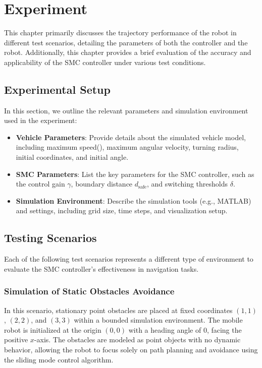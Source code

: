 \chapter{Experiment}

This chapter primarily discusses the trajectory performance of the robot in different test scenarios, detailing the parameters of both the controller and the robot. Additionally, this chapter provides a brief evaluation of the accuracy and applicability of the SMC controller under various test conditions.

\section{Experimental Setup}

In this section, we outline the relevant parameters and simulation environment used in the experiment:
\begin{itemize}
    \item \textbf{Vehicle Parameters}: Provide details about the simulated vehicle model, including maximum speed(), maximum angular velocity, turning radius, initial coordinates, and initial angle.

    \item \textbf{SMC Parameters}: List the key parameters for the SMC controller, such as the control gain \( \gamma \), boundary distance \( d_{\text{safe}} \), and switching thresholds \( \delta \).
    \item \textbf{Simulation Environment}: Describe the simulation tools (e.g., MATLAB) and settings, including grid size, time steps, and visualization setup.
\end{itemize}

\section{Testing Scenarios}

Each of the following test scenarios represents a different type of environment to evaluate the SMC controller's effectiveness in navigation tasks.

\subsection{Simulation of Static Obstacles Avoidance}
In this scenario, stationary point obstacles are placed at fixed coordinates \((1, 1)\), \((2, 2)\), and \((3, 3)\) within a bounded simulation environment. The mobile robot is initialized at the origin \((0, 0)\) with a heading angle of \(0\), facing the positive \(x\)-axis. The obstacles are modeled as point objects with no dynamic behavior, allowing the robot to focus solely on path planning and avoidance using the sliding mode control algorithm.

